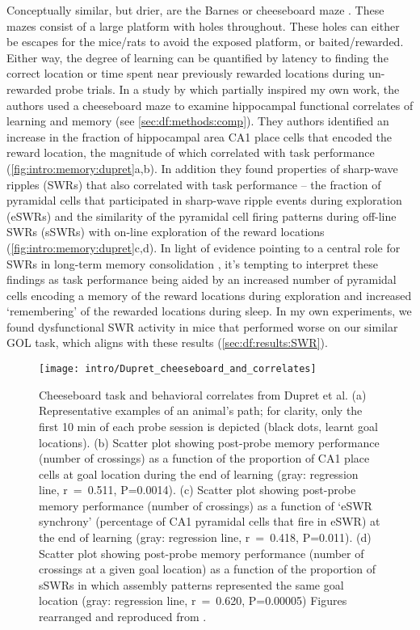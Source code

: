 Conceptually similar, but drier, are the Barnes or cheeseboard maze \citep{Barnes1979, Kesner1991, Dupret2010a}.
These mazes consist of a large platform with holes throughout.
These holes can either be escapes for the mice/rats to avoid the exposed platform, or baited/rewarded.
Either way, the degree of learning can be quantified by latency to finding the correct location or time spent near previously rewarded locations during un-rewarded probe trials.
In a study by \citeauthor{Dupret2010a} which partially inspired my own work, the authors used a cheeseboard maze to examine hippocampal functional correlates of learning and memory (see \autoref{sec:df:methods:comp}).
They authors identified an increase in the fraction of hippocampal area CA1 place cells that encoded the reward location, the magnitude of which correlated with task performance (\autoref{fig:intro:memory:dupret}a,b).
In addition they found properties of sharp-wave ripples (SWRs) that also correlated with task performance -- the fraction of pyramidal cells that participated in sharp-wave ripple events during exploration (eSWRs) and the similarity of the pyramidal cell firing patterns during off-line SWRs (sSWRs) with on-line exploration of the reward locations (\autoref{fig:intro:memory:dupret}c,d).
In light of evidence pointing to a central role for SWRs in long-term memory consolidation \citep{Buzsaki2015}, it's tempting to interpret these findings as task performance being aided by an increased number of pyramidal cells encoding a memory of the reward locations during exploration and increased `remembering' of the rewarded locations during sleep.
In my own experiments, we found dysfunctional SWR activity in mice that performed worse on our similar \ac{GOL} task, which aligns with these results (\autoref{sec:df:results:SWR}).

\begin{figure}
	\centering
	\texttt{[image: intro/Dupret\_cheeseboard\_and\_correlates]}
	\caption[Cheeseboard task and behavioral correlates from Dupret et al.]{Cheeseboard task and behavioral correlates from Dupret et al.
	(a) Representative examples of an animal's path; for clarity, only the first 10 min of each probe session is depicted (black dots, learnt goal locations).
	(b) Scatter plot showing post-probe memory performance (number of crossings) as a function of the proportion of CA1 place cells at goal location during the end of learning (gray: regression line, r~=~0.511, P=0.0014).
	(c) Scatter plot showing post-probe memory performance (number of crossings) as a function of `eSWR synchrony' (percentage of CA1 pyramidal cells that fire in eSWR) at the end of learning (gray: regression line, r~=~0.418, P=0.011).
	(d) Scatter plot showing post-probe memory performance (number of crossings at a given goal location) as a function of the proportion of sSWRs in which assembly patterns represented the same goal location (gray: regression line, r~=~0.620, P=0.00005)
	Figures rearranged and reproduced from \citet{Dupret2010a}.}
	\label{fig:intro:memory:dupret}
\end{figure}

